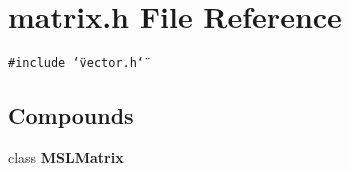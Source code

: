 \section{matrix.h File Reference}
\label{matrix_h}
{\tt \#include \char`\"{}vector.h\char`\"{}}\par
\subsection*{Compounds}
\begin{CompactItemize}
\item 
class {\bf MSLMatrix}
\end{CompactItemize}
